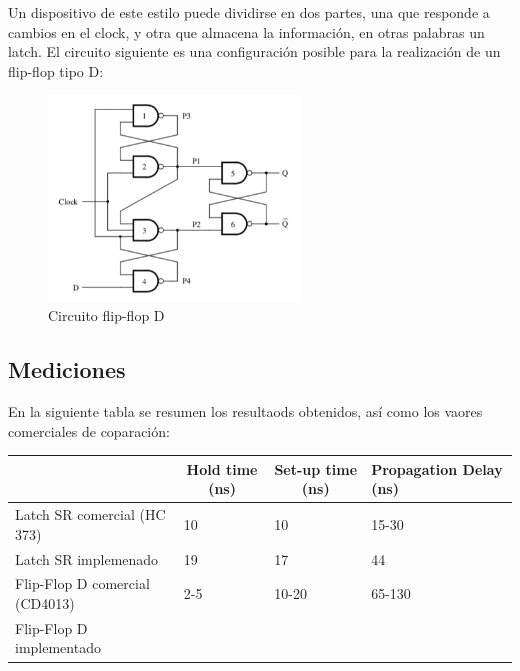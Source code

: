 Un dispositivo de este estilo puede dividirse en dos partes, una que responde a cambios en el clock, y otra que almacena la información, en otras palabras un latch. El circuito siguiente es una configuración posible para la realización de un flip-flop tipo D:

\begin{figure}[H]
	\centering
	\includegraphics[width=0.6\textwidth]{Ejercicio6/Recursos/flipflopDcircuito}
	\caption{Circuito flip-flop D}
\end{figure}

\subsection{Mediciones}

En la siguiente tabla se resumen los resultaods obtenidos, as\'i como los vaores comerciales de coparaci\'on:

\begin{table}[H]
\begin{tabular}{llll}\hline
\multicolumn{1}{c}{}           & \multicolumn{1}{c}{Hold time (ns)} & \multicolumn{1}{c}{Set-up time (ns)} & Propagation Delay (ns) \\
\hline
Latch SR comercial (HC 373)    & 10                                 & 10                                   & 15-30                  \\
Latch SR implemenado           & 19                              &   17                                   &  44                \\
Flip-Flop D comercial (CD4013) & 2-5                                & 10-20                                & 65-130                 \\
Flip-Flop D implementado       &    

                                &                                      &                        \\  \hline
\end{tabular}
\end{table}
